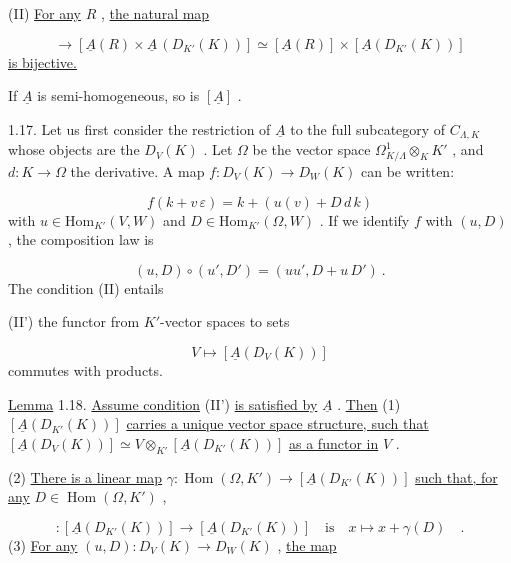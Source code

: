 (II)  \underline{For any} $R$ , \underline{the natural map}

\begin{equation*}
[\underline{A}(R \times_K D_{K'}(K))] \to [\underline{A}(R) \times \underline{A}\,(D_{K'}(K))] \simeq [\underline{A}(R)] \times [\underline{A}(D_{K'}(K))]
\end{equation*}
\underline{is bijective.}

If $\underline{A}$ is semi-homogeneous, so is $[\underline{A}]$ .

1.17.  Let us first consider the restriction of $\underline{A}$ to the full subcategory of $C_{\Lambda,K}$ whose objects are the $D_V(K)$ . Let $\Omega$ be the vector space $\Omega^1_{K/\Lambda} \otimes_K K'$ , and $d : K \to \Omega$ the derivative. A map $f : D_V(K) \to D_W(K)$ can be written:

\begin{equation*}
f(k + v\,\varepsilon) = k + (u(v) + D\,d\,k)
\end{equation*}
with $u \in \mathrm{Hom}_{K'}(V, W)$ and $D \in \mathrm{Hom}_{K'}(\Omega, W)$ . If we identify $f$ with $(u, D)$ , the composition law is

\begin{equation*}
(u, D) \circ (u', D') = (uu', D + u\,D')\ .
\end{equation*}
The condition (II) entails

(II')  the functor from $K'$-vector spaces to sets

\begin{equation*}
V \longmapsto [\underline{A}(D_V(K))]
\end{equation*}
commutes with products.

\underline{Lemma} 1.18.  \underline{Assume condition} (II') \underline{is satisfied by} $\underline{A}$ . \underline{Then}
(1)  $[\underline{A}(D_{K'}(K))]$  \underline{carries a unique vector space structure, such that}  $[\underline{A}(D_{V}(K))] \simeq V \otimes_{K'} [\underline{A}(D_{K'}(K))]$  \underline{as a functor in}  $V$ .

(2)   \underline{There is a linear map}  $\gamma : \operatorname{Hom}(\Omega,K') \rightarrow [\underline{A}(D_{K'}(K))]$  \underline{such that, for any}  $D \in \operatorname{Hom}(\Omega, K')$  ,

\begin{equation*}
[\underline{A}((k, D))] : [\underline{A}(D_{K'}(K))] \rightarrow [\underline{A}(D_{K'}(K))] \quad \text{is} \quad x \longmapsto x + \gamma(D) \quad .
\end{equation*}
(3)   \underline{For any}  $(u, D) : D_{V}(K) \longrightarrow D_{W}(K)$  , \underline{the map}

